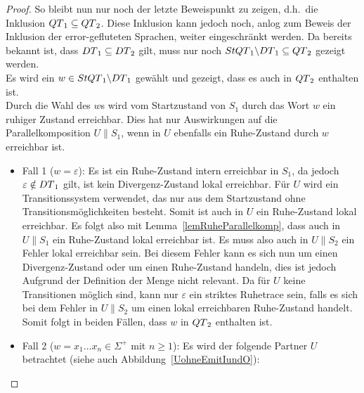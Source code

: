 \begin{proof}
  So bleibt nun nur noch der letzte Beweispunkt zu zeigen, d.h.\ die Inklusion
  $QT{}_1\subseteq QT{}_2$. Diese Inklusion kann jedoch noch, anlog zum Beweis
  der Inklusion der error-gefluteten Sprachen, weiter eingeschränkt werden.
  Da bereits bekannt ist, dass $DT{}_1\subseteq DT{}_2$ gilt, muss nur
  noch $StQT{}_1\backslash DT{}_1\subseteq QT{}_2$ gezeigt werden.\\
  Es wird ein $w\in StQT{}_1\backslash DT{}_1$ gewählt und gezeigt, dass
  es auch in $QT{}_2$ enthalten ist.\\
  Durch die Wahl des $w$s wird vom Startzustand von $S_1$ durch das Wort $w$
  ein ruhiger Zustand erreichbar. Dies hat nur Auswirkungen auf die
  Parallelkomposition $U\|S_1$, wenn in $U$ ebenfalls ein Ruhe-Zustand durch
  $w$ erreichbar ist.
  \begin{itemize}
    \item Fall 1 ($w=\varepsilon$): Es ist ein Ruhe-Zustand intern erreichbar in
      $S_1$, da jedoch $\varepsilon\notin DT{}_1$ gilt, ist kein
      Divergenz-Zustand lokal erreichbar. Für $U$ wird ein Transitionssystem
      verwendet, das nur aus dem Startzustand ohne Transitionsmöglichkeiten
      besteht. Somit ist auch in $U$ ein Ruhe-Zustand lokal erreichbar. Es
      folgt also mit Lemma~\ref{lemRuheParallelkomp}, dass auch in $U\|S_1$ ein
      Ruhe-Zustand lokal erreichbar ist. Es muss also auch in $U\|S_2$ ein
      Fehler lokal erreichbar sein. Bei diesem Fehler kann es sich nun um einen
      Divergenz-Zustand oder um einen Ruhe-Zustand handeln, dies ist jedoch
      Aufgrund der Definition der Menge \QT{} nicht relevant. Da für $U$ keine
      Transitionen möglich sind, kann nur $\varepsilon$ ein striktes
      Ruhetrace sein, falls es sich bei dem Fehler in $U\|S_2$ um einen lokal
      erreichbaren Ruhe-Zustand handelt. Somit folgt in beiden Fällen, dass $w$
      in $QT{}_2$ enthalten ist.
    \item Fall 2 ($w=x_1\dots x_n\in \Sigma ^+$ mit $n\geq 1$): Es wird der
      folgende Partner $U$ betrachtet (siehe auch Abbildung~\ref{UohneEmitIundO}):
\end{itemize}
\end{proof}
